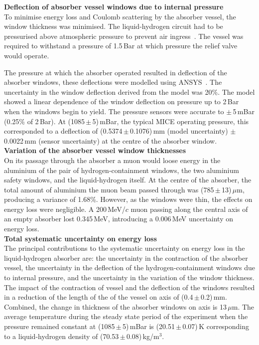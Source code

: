 \noindent\textbf{Deflection of absorber vessel windows due to internal
  pressure} \\
\noindent
To minimise energy loss and Coulomb scattering by the absorber vessel,
the window thickness was minimised.
The liquid-hydrogen circuit had to be pressurised
above atmospheric pressure to prevent air
ingress~\cite{1748-0221-13-09-T09008}\cite{Ishimoto}. 
The vessel was required to withstand a pressure of 1.5\,Bar at which
pressure the relief valve would operate.

The pressure at which the absorber operated resulted in deflection of
the absorber windows, these deflections were modelled using
ANSYS~\cite{NOTE155}.
The uncertainty in the window deflection derived from the model was
20\%.
The model showed a linear dependence of the window deflection on
pressure up to 2\,Bar when the windows begin to yield.
The pressure sensors were accurate to $\mathrm{\pm}$\,5\,mBar
(0.25\% of 2\,Bar).
At (1085\,$\mathrm{\pm}$\,5)\,mBar, the typical MICE operating
pressure, this corresponded to a deflection of
(0.5374\,$\mathrm{\pm}$\,0.1076)\,mm (model uncertainty)
$\mathrm{\pm}$\,0.0022\,mm (sensor uncertainty) at the centre of the
absorber window. \\

\noindent\textbf{Variation of the absorber vessel window thicknesses} \\
\noindent
On its passage through the absorber a muon would loose energy in the
aluminium of the pair of hydrogen-containment windows, the two
aluminium safety windows, and the liquid-hydrogen itself.
At the centre of the absorber, the total amount of aluminium the muon
beam passed through was (785\,$\mathrm{\pm}$\,13)\,$\mu$m, producing a variance
of 1.68\%.
However, as the windows were thin, the effects on energy loss were
negligible.
A 200\,MeV/$c$ muon passing along the central axis of an empty
absorber lost 0.345\,MeV, introducing a 0.006\,MeV uncertainty
on energy loss.  \\

\noindent\textbf{Total systematic uncertainty on energy loss} \\
\noindent
The principal contributions to the systematic uncertainty on energy
loss in the liquid-hydrogen absorber are: the uncertainty in the
contraction of the absorber vessel, the uncertainty in the deflection
of the hydrogen-containment windows due to internal pressure, and the
uncertainty in the variation of the window thickness.
The impact of the contraction of vessel and the deflection of the
windows resulted in a reduction of the length of the of the vessel on
axis of (0.4\,$\mathrm{\pm}$\,0.2)\,mm.
Combined, the change in thickness of the absorber windows on axis is 13\,$\mu$m.
The average temperature during the steady state period of the
experiment when the pressure remained constant at
(1085\,$\mathrm{\pm}$\,5)\,mBar is (20.51\,$\mathrm{\pm}$\,0.07)\,K 
corresponding to a liquid-hydrogen density of (70.53\,$\mathrm{\pm}$\,0.08)\,kg/m$^{3}$.

